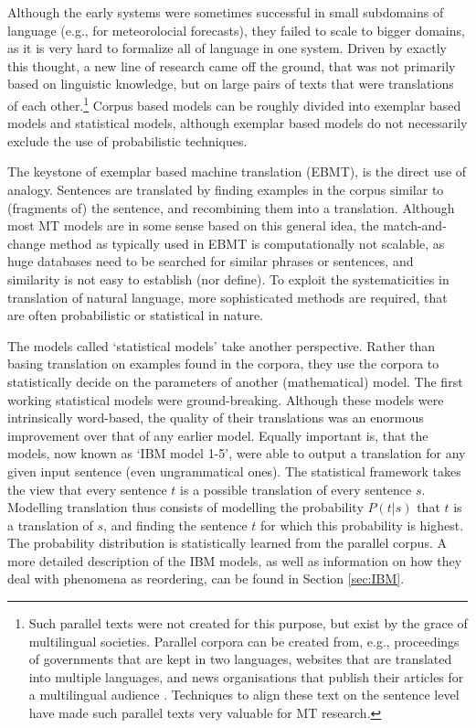 Although the early systems were sometimes successful in small subdomains of language (e.g., \cite{chandioux1976meteo} for meteorolocial forecasts), they failed to scale to bigger domains, as it is very hard to formalize all of language in one system. Driven by exactly this thought, a new line of research came off the ground, that was not primarily based on linguistic knowledge, but on large pairs of texts that were translations of each other.\footnote{Such parallel texts were not created for this purpose, but exist by the grace of multilingual societies. Parallel corpora can be created from, e.g., proceedings of governments that are kept in two languages, websites that are translated into multiple languages, and news organisations that publish their articles for a multilingual audience \citep{koehn2008statistical}. Techniques to align these text on the sentence level \citep[e.g.,][]{varga2007parallel} have made such parallel texts very valuable for MT research.} Corpus based models can be roughly divided into exemplar based models and statistical models, although exemplar based models do not necessarily exclude the use of probabilistic techniques.

The keystone of exemplar based machine translation (EBMT), is the direct use of analogy. Sentences are translated by finding examples in the corpus similar to (fragments of) the sentence, and recombining them into a translation. Although most MT models are in some sense based on this general idea, the match-and-change method as typically used in EBMT is computationally not scalable, as huge databases need to be searched for similar phrases or sentences, and similarity is not easy to establish (nor define). To exploit the systematicities in translation of natural language, more sophisticated methods are required, that are often probabilistic or statistical in nature.


The models called `statistical models' take another perspective. Rather than basing translation on examples found in the corpora, they use the corpora to statistically decide on the parameters of another (mathematical) model. The first working statistical models \citep{brown1988statistical,brown1990statistical,brown1993mathematics} were ground-breaking. Although these models were intrinsically word-based, the quality of their translations was an enormous improvement over that of any earlier model. Equally important is, that the models, now known as `IBM model 1-5', were able to output a translation for any given input sentence (even ungrammatical ones). The statistical framework takes the view that every sentence $t$ is a possible translation of every sentence $s$. Modelling translation thus consists of modelling the probability $P(t|s)$ that $t$ is a translation of $s$, and finding the sentence $t$ for which this probability is highest. The probability distribution is statistically learned from the parallel corpus. A more detailed description of the IBM models, as well as information on how they deal with phenomena as reordering, can be found in Section \ref{sec:IBM}.

